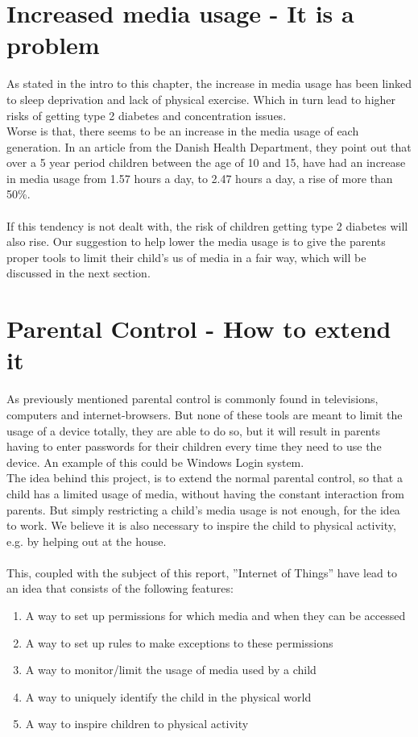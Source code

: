 \section{Increased media usage - It is a problem}
As stated in the intro to this chapter, the increase in media usage has been linked to sleep deprivation and lack of physical exercise. Which in turn lead to higher risks of getting type 2 diabetes and concentration issues.\\
Worse is that, there seems to be an increase in the media usage of each generation. In an article from the Danish Health Department, they point out that over a 5 year period children between the age of 10 and 15, have had an increase in media usage from 1.57 hours a day, to 2.47 hours a day, a rise of more than 50\%.\citep{sundhedsstyrelsen}\\
\\
If this tendency is not dealt with, the risk of children getting type 2 diabetes will also rise. Our suggestion to help lower the media usage is to give the parents proper tools to limit their child’s us of media in a fair way, which will be discussed in the next section.


\section{Parental Control - How to extend it}
\label{section:pcHowToExtend}
As previously mentioned parental control is commonly found in televisions, computers and internet-browsers. But none of these tools are meant to limit the usage of a device totally, they are able to do so, but it will result in parents having to enter passwords for their children every time they need to use the device. An example of this could be Windows Login system.\\
The idea behind this project, is to extend the normal parental control, so that a child has a limited usage of media, without having the constant interaction from parents. 
But simply restricting a child's media usage is not enough, for the idea to work. We believe it is also necessary to inspire the child to physical activity, e.g. by helping out at the house.\\
\\
This, coupled with the subject of this report, ''Internet of Things'' have lead to an idea that consists of the following features:

\begin{enumerate}
	\item A way to set up permissions for which media and when they can be accessed
	\item A way to set up rules to make exceptions to these permissions
	\item A way to monitor/limit the usage of media used by a child
	\item A way to uniquely identify the child in the physical world
	\item A way to inspire children to physical activity
\end{enumerate}


